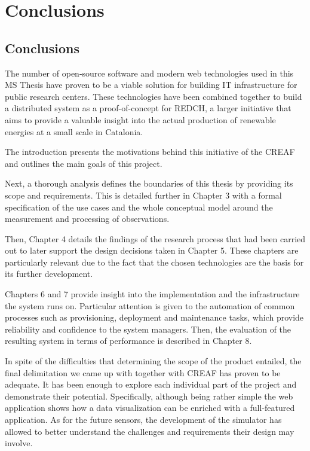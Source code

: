 \chapter{Conclusions}

\section{Conclusions}

The number of open-source software and modern web technologies used in this MS Thesis have proven to be a viable solution for building IT infrastructure for public research centers. These technologies have been combined together to build a distributed system as a proof-of-concept for REDCH, a larger initiative that aims to provide a valuable insight into the actual production of renewable energies at a small scale in Catalonia.

The introduction presents the motivations behind this initiative of the CREAF and outlines the main goals of this project.

Next, a thorough analysis defines the boundaries of this thesis by providing its scope and requirements. This is detailed further in Chapter 3 with a formal specification of the use cases and the whole conceptual model around the measurement and processing of observations.

Then, Chapter 4 details the findings of the research process that had been carried out 
to later support the design decisions taken in Chapter 5. These chapters are particularly relevant due to the fact that the chosen technologies are the basis for its further development.

Chapters 6 and 7 provide insight into the implementation and the infrastructure the system runs on. Particular attention is given to the automation of common processes such as provisioning, deployment and maintenance tasks, which provide reliability and confidence to the system managers. Then, the evaluation of the resulting system in terms of performance is described in Chapter 8.

In spite of the difficulties that determining the scope of the product entailed, the final delimitation we came up with together with CREAF has proven to be adequate. It has been enough to explore each individual part of the project and demonstrate their potential. Specifically, although being rather simple the web application shows how a data visualization can be enriched with a full-featured application. As for the future sensors, the development of the simulator has allowed to better understand the challenges and requirements their design may involve.

